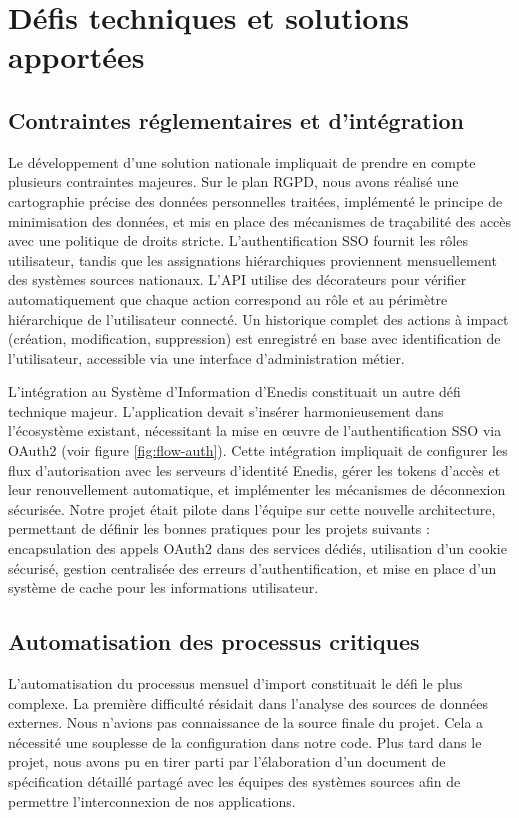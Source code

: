 \section{Défis techniques et solutions apportées}

\subsection{Contraintes réglementaires et d'intégration}
Le développement d'une solution nationale impliquait de prendre en compte plusieurs contraintes majeures.
Sur le plan RGPD, nous avons réalisé une cartographie précise des données personnelles traitées, implémenté le principe de minimisation des données, et mis en place des mécanismes de traçabilité des accès avec une politique de droits stricte.
L'authentification SSO fournit les rôles utilisateur, tandis que les assignations hiérarchiques proviennent mensuellement des systèmes sources nationaux. L'API utilise des décorateurs pour vérifier automatiquement que chaque action correspond au rôle et au périmètre hiérarchique de l'utilisateur connecté.
Un historique complet des actions à impact (création, modification, suppression) est enregistré en base avec identification de l'utilisateur, accessible via une interface d'administration métier.

L'intégration au Système d'Information d'Enedis constituait un autre défi technique majeur.
L'application devait s'insérer harmonieusement dans l'écosystème existant, nécessitant la mise en œuvre de l'authentification SSO via OAuth2 (voir figure \ref{fig:flow-auth}).
Cette intégration impliquait de configurer les flux d'autorisation avec les serveurs d'identité Enedis, gérer les tokens d'accès et leur renouvellement automatique, et implémenter les mécanismes de déconnexion sécurisée.
Notre projet était pilote dans l'équipe sur cette nouvelle architecture, permettant de définir les bonnes pratiques pour les projets suivants : encapsulation des appels OAuth2 dans des services dédiés, utilisation d'un cookie sécurisé, gestion centralisée des erreurs d'authentification, et mise en place d'un système de cache pour les informations utilisateur.

\subsection{Automatisation des processus critiques}
L'automatisation du processus mensuel d'import constituait le défi le plus complexe.
La première difficulté résidait dans l'analyse des sources de données externes. Nous n'avions pas connaissance de la source finale du projet. Cela a nécessité une souplesse de la configuration dans notre code. Plus tard dans le projet, nous avons pu en tirer parti par l'élaboration d'un document de spécification détaillé partagé avec les équipes des systèmes sources afin de permettre l'interconnexion de nos applications.

